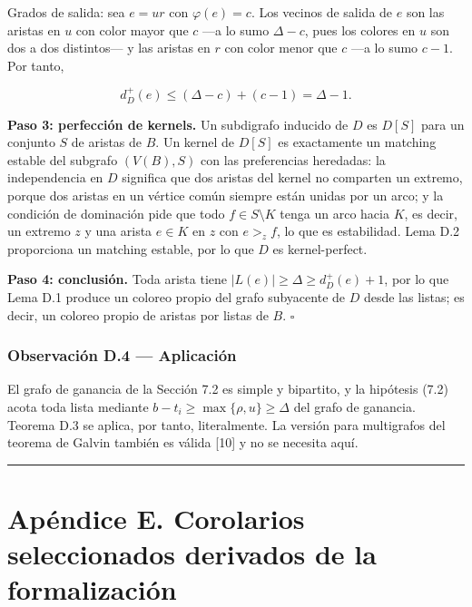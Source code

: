 \documentclass[
  spanish,
  11pt,
  a4paper,
]{article}
\begin{document}
Grados de salida: sea \(e=ur\) con \(\varphi(e)=c\). Los vecinos de salida de \(e\) son las aristas en \(u\) con color mayor que \(c\) ---a lo sumo \(\Delta-c\), pues los colores en \(u\) son dos a dos distintos--- y las aristas en \(r\) con color menor que \(c\) ---a lo sumo \(c-1\). Por tanto,

\[
d^+_D(e)\le(\Delta-c)+(c-1)=\Delta-1.
\]

\textbf{Paso 3: perfección de kernels.} Un subdigrafo inducido de \(D\) es \(D[S]\) para un conjunto \(S\) de aristas de \(B\). Un kernel de \(D[S]\) es exactamente un matching estable del subgrafo \((V(B),S)\) con las preferencias heredadas: la independencia en \(D\) significa que dos aristas del kernel no comparten un extremo, porque dos aristas en un vértice común siempre están unidas por un arco; y la condición de dominación pide que todo \(f\in S\setminus K\) tenga un arco hacia \(K\), es decir, un extremo \(z\) y una arista \(e\in K\) en \(z\) con \(e>_zf\), lo que es estabilidad. Lema D.2 proporciona un matching estable, por lo que \(D\) es kernel-perfect.

\textbf{Paso 4: conclusión.} Toda arista tiene \(|L(e)|\ge\Delta\ge d^+_D(e)+1\), por lo que Lema D.1 produce un coloreo propio del grafo subyacente de \(D\) desde las listas; es decir, un coloreo propio de aristas por listas de \(B\). \(\square\)

\subsubsection{Observación D.4 --- Aplicación}\label{observaciuxf3n-d.4-aplicaciuxf3n}

El grafo de ganancia de la Sección 7.2 es simple y bipartito, y la hipótesis (7.2) acota toda lista mediante \(b-t_i\ge\max\{\rho,u\}\ge\Delta\) del grafo de ganancia. Teorema D.3 se aplica, por tanto, literalmente. La versión para multigrafos del teorema de Galvin también es válida {[}10{]} y no se necesita aquí.

\begin{center}\rule{0.5\linewidth}{0.5pt}\end{center}

\section{Apéndice E. Corolarios seleccionados derivados de la formalización}\label{apuxe9ndice-e.-corolarios-seleccionados-derivados-de-la-formalizaciuxf3n}
\end{document}
